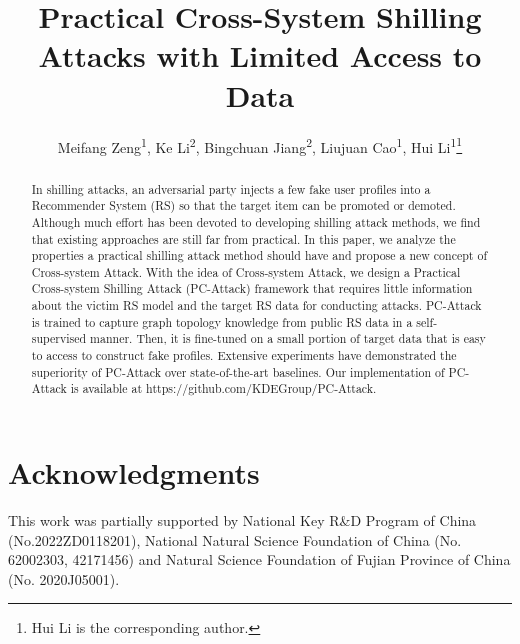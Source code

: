 \documentclass[letterpaper]{article} %
\title{Practical Cross-System Shilling Attacks with Limited Access to Data}
\author {
    Meifang Zeng\textsuperscript{\rm 1},
    Ke Li\textsuperscript{\rm 2},
    Bingchuan Jiang\textsuperscript{\rm 2},
    Liujuan Cao\textsuperscript{\rm 1},
    Hui Li\textsuperscript{\rm 1}\thanks{Hui Li is the corresponding author.}\\
}
\begin{document}
\maketitle

\begin{abstract}
In shilling attacks, an adversarial party injects a few fake user profiles into a Recommender System (RS) so that the target item can be promoted or demoted. Although much effort has been devoted to developing shilling attack methods, we find that existing approaches are still far from practical. In this paper, we analyze the properties a practical shilling attack method should have and propose a new concept of Cross-system Attack. With the idea of Cross-system Attack, we design a Practical Cross-system Shilling Attack (PC-Attack) framework that requires little information about the victim RS model and the target RS data for conducting attacks. PC-Attack is trained to capture graph topology knowledge from public RS data in a self-supervised manner. Then, it is fine-tuned on a small portion of target data that is easy to access to construct fake profiles. Extensive experiments have demonstrated the superiority of PC-Attack over state-of-the-art baselines. Our implementation of PC-Attack is available at https://github.com/KDEGroup/PC-Attack.
\end{abstract}








\section*{Acknowledgments}
This work was partially supported by National Key R\&D Program of China (No.2022ZD0118201), National Natural Science Foundation of China (No. 62002303, 42171456) and  Natural Science Foundation of Fujian Province of China (No. 2020J05001).


\end{document}
